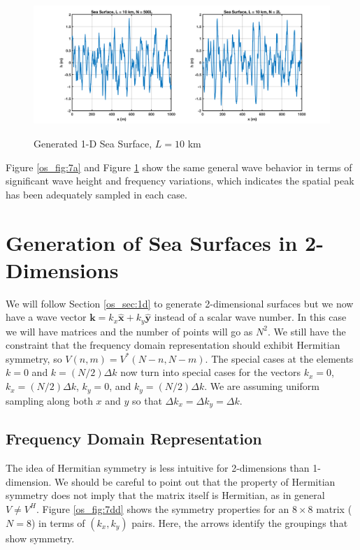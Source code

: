 \begin{figure}[ht]
  \begin{center}
\includegraphics[width=6in]{../media/Ocean_Surface/sea_surface_10000.png}
  \end{center}
  \renewcommand{\baselinestretch}{1} \small\normalsize
  \begin{quote}
    \caption[Generated 1-D Sea Surface, $L = 10$ km]{Generated 1-D Sea Surface, $L = 10$ km\label{os_fig:7aa}}
  \end{quote}
\end{figure}
\renewcommand{\baselinestretch}{2} \small\normalsize

Figure \ref{os_fig:7a} and Figure \ref{os_fig:7aa} show the same general wave behavior in terms of significant wave height and frequency variations, which indicates the spatial peak has been adequately sampled in each case.

\section {Generation of Sea Surfaces in 2-Dimensions}
We will follow Section \ref{os_sec:1d} to generate 2-dimensional surfaces but we now have a wave vector $\mathbf{k} = k_x\hat{\mathbf{x}} + k_y\hat{\mathbf{y}}$ instead of a scalar wave number. In this case we will have matrices and the number of points will go as $N^2$. We still have the constraint that the frequency domain representation should exhibit Hermitian symmetry, so $V(n,m) = V^*(N-n,N-m)$. The special cases at the elements $k = 0$ and $k = (N/2)\Delta k$ now turn into special cases for the vectors $k_x = 0$, $k_x = (N/2)\Delta k$, $k_y = 0$, and $k_y = (N/2)\Delta k$. We are assuming uniform sampling along both $x$ and $y$ so that $\Delta k_x = \Delta k_y = \Delta k$.

\subsection {Frequency Domain Representation}
The idea of Hermitian symmetry is less intuitive for 2-dimensions than 1-dimension. We should be careful to point out that the property of Hermitian symmetry does not imply that the matrix itself is Hermitian, as in general $V \neq V^H$. Figure \ref{os_fig:7dd} shows the symmetry properties for an $8 \times 8$ matrix ($N = 8$) in terms of $(k_x, k_y)$ pairs. Here, the arrows identify the groupings that show symmetry. 

